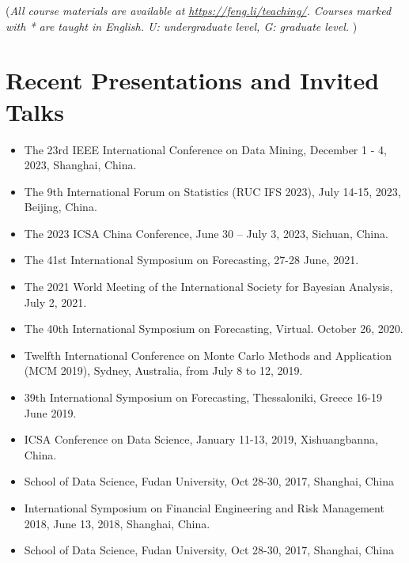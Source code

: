 \documentclass[twoside,a4paper]{article}
\begin{document}
{\footnotesize (\emph{All course materials are available at
    \emph{\url{https://feng.li/teaching/}}. Courses marked with * are taught in English. U: undergraduate level, G: graduate level. })}


\section*{Recent Presentations and Invited Talks}
\begin{itemize}

\item The 23rd IEEE International Conference on Data Mining, December 1 - 4, 2023, Shanghai, China.

\item The 9th International Forum on Statistics (RUC IFS 2023), July 14-15, 2023, Beijing, China.

\item The 2023 ICSA China Conference, June 30 – July 3, 2023, Sichuan, China.

\item The 41st International Symposium on Forecasting, 27-28 June, 2021.

\item The 2021 World Meeting of the International Society for Bayesian Analysis, July 2, 2021.

\item The 40th International Symposium on Forecasting, Virtual. October 26, 2020.

\item Twelfth International Conference on Monte Carlo Methods and Application (MCM 2019), Sydney, Australia, from July 8 to 12, 2019.

\item 39th International Symposium on Forecasting, Thessaloniki, Greece 16-19 June 2019.

\item ICSA Conference on Data Science, January 11-13, 2019, Xishuangbanna, China.

\item School of Data Science, Fudan University, Oct 28-30, 2017, Shanghai, China

\item International Symposium on Financial Engineering and Risk Management 2018, June 13, 2018, Shanghai, China.

\item School of Data Science, Fudan University, Oct 28-30, 2017, Shanghai, China


\end{itemize}
\end{document}

